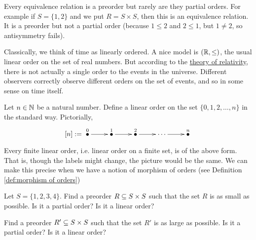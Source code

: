\begin{exampleENG}
Every equivalence relation is a preorder but rarely are they partial orders. For example if $S=\{1,2\}$ and we put $R=S\times S$, then this is an equivalence relation. It is a preorder but not a partial order (because $1\leq 2$ and $2\leq 1$, but $1\neq 2$, so antisymmetry fails).
\end{exampleENG}

\begin{exampleRUS}
\end{exampleRUS}

\begin{applicationENG}
Classically, we think of time as linearly ordered. A nice model is $(\RR,\leq)$, the usual linear order on the set of real numbers. But according to the \href{http://en.wikipedia.org/wiki/Relativity_of_simultaneity}{\text theory of relativity}, there is not actually a single order to the events in the universe. Different observers correctly observe different orders on the set of events, and so in some sense on time itself. 
\end{applicationENG}

\begin{applicationRUS}
\end{applicationRUS}

\begin{exampleENG}\label{ex:finite lo}
Let $n\in\NN$ be a natural number. Define a linear order on the set $\{0,1,2,\ldots,n\}$ in the standard way. Pictorially, 
$$
[n]:=\xymatrix{\LMO{0}\ar[r]&\LMO{1}\ar[r]&\LMO{2}\ar[r]&\cdots\ar[r]&\LMO{n}}
$$

Every finite linear order, i.e. linear order on a finite set, is of the above form. That is, though the labels might change, the picture would be the same. We can make this precise when we have a notion of morphism of orders (see Definition \ref{def:morphism of orders})
\end{exampleENG}

\begin{exampleRUS}\label{ex:finite lo}
\end{exampleRUS}

\begin{exerciseENG}
Let $S=\{1,2,3,4\}$. 
\sexc Find a preorder $R\ss S\times S$ such that the set $R$ is as small as possible. Is it a partial order? Is it a linear order?
\item Find a preorder $R'\ss S\times S$ such that the set $R'$ is as large as possible. Is it a partial order? Is it a linear order?
\endsexc
\end{exerciseENG}

